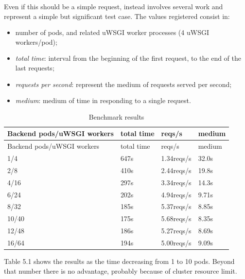 Even if this should be a simple request, instead involves several work and represent a simple but significant test case. The values registered consist in:

\begin{itemize}
\item number of pods, and related uWSGI worker processes (4 uWSGI workers/pod);
\item \textit{total time}: interval from the beginning of the first request,   to the end of the last requests;
\item \textit{requests per second}: represent the medium of requests served per second;
\item \textit{medium}: medium of time in responding to a single request.
\end{itemize}

\begin{longtable}[c]{@{}llll@{}}
\caption{Benchmark results}\tabularnewline
\toprule
Backend pods/uWSGI workers & total time & reqs/s & medium \tabularnewline
\midrule
\endfirsthead
\toprule
Backend pods/uWSGI workers & total time & reqs/s & medium \tabularnewline
\midrule
\endhead
1/4 & 647s & 1.34reqs/s & 32.0s \tabularnewline
2/8 & 410s & 2.44reqs/s & 19.8s \tabularnewline
4/16 & 297s & 3.34reqs/s & 14.3s \tabularnewline
6/24 & 202s & 4.94reqs/s & 9.71s \tabularnewline
8/32 & 185s & 5.37reqs/s & 8.85s \tabularnewline
10/40 & 175s & 5.68reqs/s & 8.35s \tabularnewline
12/48 & 186s & 5.27reqs/s & 8.69s \tabularnewline
16/64 & 194s & 5.00reqs/s & 9.09s \tabularnewline
\bottomrule
\end{longtable}

Table 5.1 shows the results as the time decreasing from 1 to 10 pods. Beyond that number there is no advantage, probably because of cluster resource limit.
